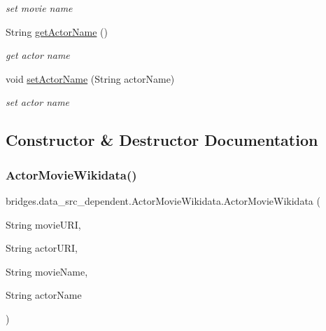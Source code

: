 \begin{DoxyCompactItemize}
\begin{DoxyCompactList}\small\item\em set movie name \end{DoxyCompactList}\item 
String \hyperlink{classbridges_1_1data__src__dependent_1_1_actor_movie_wikidata_a46d666a914ade6d3fcc99ddfd8d104bf}{get\+Actor\+Name} ()
\begin{DoxyCompactList}\small\item\em get actor name \end{DoxyCompactList}\item 
void \hyperlink{classbridges_1_1data__src__dependent_1_1_actor_movie_wikidata_adcc408940f750be41cc25d70653dac07}{set\+Actor\+Name} (String actor\+Name)
\begin{DoxyCompactList}\small\item\em set actor name \end{DoxyCompactList}\end{DoxyCompactItemize}


\subsection{Constructor \& Destructor Documentation}
\mbox{\label{classbridges_1_1data__src__dependent_1_1_actor_movie_wikidata_a0204efcc0ee869cf059228b99965a9ad}} 
\subsubsection{\texorpdfstring{Actor\+Movie\+Wikidata()}{ActorMovieWikidata()}}
{\footnotesize\ttfamily bridges.\+data\+\_\+src\+\_\+dependent.\+Actor\+Movie\+Wikidata.\+Actor\+Movie\+Wikidata (\begin{DoxyParamCaption}\item[{String}]{movie\+U\+RI,  }\item[{String}]{actor\+U\+RI,  }\item[{String}]{movie\+Name,  }\item[{String}]{actor\+Name }\end{DoxyParamCaption})}


